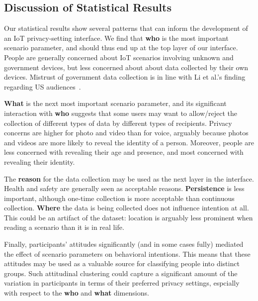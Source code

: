 \subsection{Discussion of Statistical Results}
Our statistical results show several patterns that can inform the development of an IoT privacy-setting interface. We find that \textbf{who} is the most important scenario parameter, and should thus end up at the top layer of our interface. People are generally concerned about IoT scenarios involving unknown and government devices, but less concerned about about data collected by their own devices. Mistrust of government data collection is in line with Li et al.'s finding regarding US audiences~\cite{li2017cross}.

\textbf{What} is the next most important scenario parameter, and its significant interaction with \textbf{who} suggests that some users may want to allow/reject the collection of different types of data by different types of recipients. Privacy concerns are higher for photo and video than for voice, arguably because photos and videos are more likely to reveal the identity of a person. Moreover, people are less concerned with revealing their age and presence, and most concerned with revealing their identity.

The \textbf{reason} for the data collection may be used as the next layer in the interface. Health and safety are generally seen as acceptable reasons. \textbf{Persistence} is less important, although one-time collection is more acceptable than continuous collection. \textbf{Where} the data is being collected does not influence intention at all. This could be an artifact of the dataset: location is arguably less prominent when reading a scenario than it is in real life.

Finally, participants' attitudes significantly (and in some cases fully) mediated the effect of scenario parameters on behavioral intentions. This means that these attitudes may be used as a valuable source for classifying people into distinct groups. Such attitudinal clustering could capture a significant amount of the variation in participants in terms of their preferred privacy settings, espcially with respect to the \textbf{who} and \textbf{what} dimensions.